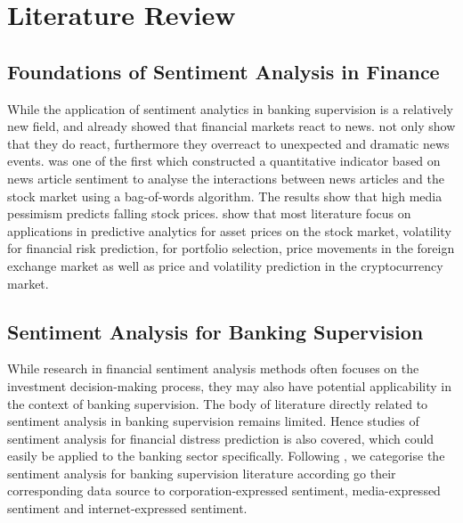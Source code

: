 \chapter{Literature Review}\label{sec3}
\thispagestyle{empty}



\section{Foundations of Sentiment Analysis in Finance}

While the application of sentiment analytics in banking supervision is a relatively new field, \cite{debondt1985} and \cite{cutler1988} already showed that financial markets react to news. \cite{debondt1985} not only show that they do react, furthermore they overreact to unexpected and dramatic news events. \cite{tetlock2007} was one of the first which constructed a quantitative indicator based on news article sentiment to analyse the interactions between news articles and the stock market using a bag-of-words algorithm. The results show that high media pessimism predicts falling stock prices. \cite{du2024} show that most literature focus on applications in predictive analytics for asset prices on the stock market, volatility for financial risk prediction, for portfolio selection, price movements in the foreign exchange market as well as price and volatility prediction in the cryptocurrency market.

\section{Sentiment Analysis for Banking Supervision}

While research in financial sentiment analysis methods often focuses on the investment decision-making process, they may also have potential applicability in the context of banking supervision. The body of literature directly related to sentiment analysis in banking supervision remains limited. Hence studies of sentiment analysis for financial distress prediction is also covered, which could easily be applied to the banking sector specifically. Following \cite{kearney2014}, we categorise the sentiment analysis for banking supervision literature according go their corresponding data source to corporation-expressed sentiment, media-expressed sentiment and internet-expressed sentiment. \\

